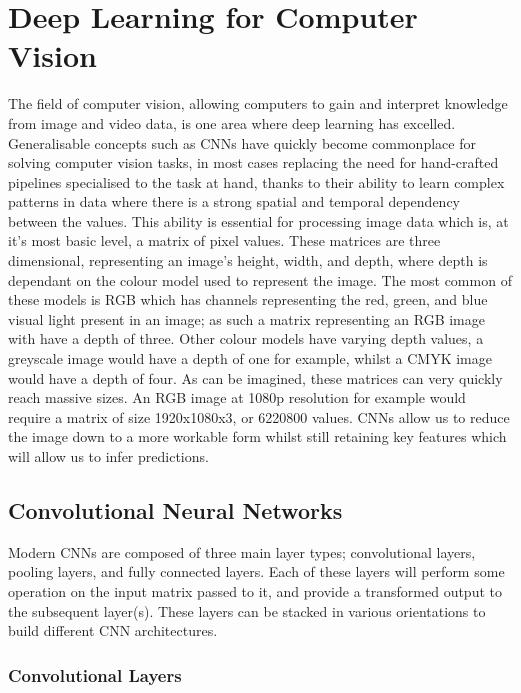 \section{Deep Learning for Computer Vision}\label{ch:Background,sec:DLforCV}

The field of computer vision, allowing computers to gain and interpret knowledge from image and video data, is one area where deep learning has excelled. Generalisable concepts such as CNNs have quickly become commonplace for solving computer vision tasks, in most cases replacing the need for hand-crafted pipelines specialised to the task at hand, thanks to their ability to learn complex patterns in data where there is a strong spatial and temporal dependency between the values. This ability is essential for processing image data which is, at it's most basic level, a matrix of pixel values. These matrices are three dimensional, representing an image's height, width, and depth, where depth is dependant on the colour model used to represent the image. The most common of these models is RGB which has channels representing the red, green, and blue visual light present in an image; as such a matrix representing an RGB image with have a depth of three. Other colour models have varying depth values, a greyscale image would have a depth of one for example, whilst a CMYK image would have a depth of four. As can be imagined, these matrices can very quickly reach massive sizes. An RGB image at 1080p resolution for example would require a matrix of size 1920x1080x3, or 6220800 values. CNNs allow us to reduce the image down to a more workable form whilst still retaining key features which will allow us to infer predictions.

\subsection{Convolutional Neural Networks}\label{ch:Background,sec:CNN,sub:CNN}
Modern CNNs are composed of three main layer types; convolutional layers, pooling layers, and fully connected layers. Each of these layers will perform some operation on the input matrix passed to it, and provide a transformed output to the subsequent layer(s). These layers can be stacked in various orientations to build different CNN architectures.

\subsubsection{Convolutional Layers}\label{ch:Background,sec:CNN,sub:CNN,subsub:convolution}

